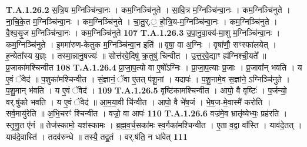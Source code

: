 \documentclass[17pt]{extarticle}
\begin{document}
                  \newline
                                                                  \textbf{ T.A.1.26.2} \newline
                  स॒त्रि॒य म॒ग्निञ्चि॑न्वा॒नः । कम॒ग्निञ्चि॑नुते ।  सा॒वि॒त्र म॒ग्निञ्चि॑न्वा॒नः । कम॒ग्निञ्चि॑नुते । ना॒चि॒के॒त म॒ग्निञ्चि॑न्वा॒नः । कम॒ग्निञ्चि॑नुते ।  चा॒तु॒र्.॒ हो॒त्रि॒य-म॒ग्निञ्चि॑न्वा॒नः । कम॒ग्निञ्चि॑नुते ।  वै॒श्व॒सृ॒ज म॒ग्निञ्चि॑न्वा॒नः । कम॒ग्निञ्चि॑नुते \textbf{ 107} \newline
                  \newline
                                                                  \textbf{ T.A.1.26.3} \newline
                  उ॒पा॒नु॒वा॒क्य॑-मा॒शु म॒ग्निञ्चि॑न्वा॒नः । कम॒ग्निञ्चि॑नुते । इ॒ममा॑रुण-केतुक म॒ग्निञ्चि॑न्वा॒न इति॑ ॥ वृषा॒ वा अ॒ग्निः । वृषा॑णौ॒ सꣳस्फा॑लयेत् । ह॒न्येता᳚स्य य॒ज्ञ्ः । तस्मा॒न्नानु॒षज्यः॑ ॥  सोत्त॑रवे॒दिषु॑ क्र॒तुषु॑ चिन्वीत । उ॒त्त॒र॒वे॒द्याꣳ ह्य॑ग्निश्ची॒यते᳚ ॥ प्र॒जाका॑मश्चिन्वीत \textbf{ 108} \newline
                  \newline
                                                                  \textbf{ T.A.1.26.4} \newline
                  प्रा॒जा॒प॒त्यो वा ए॒षो᳚ऽग्निः । प्रा॒जा॒प॒त्याः प्र॒जाः । प्र॒जावा᳚न् भवति । य ए॒वं ॅवेद॑ ॥ प॒शुका॑मश्चिन्वीत । सं॒ज्ञानं॒ ॅवा ए॒तत् प॑शू॒नां । यदापः॑ ।  प॒शू॒नामे॒व स॒ज्ञांने॒ ऽग्निञ्चि॑नुते । प॒शु॒मान् भ॑वति । य ए॒वं ॅवेद॑ । \textbf{ 109} \newline
                  \newline
                                                                  \textbf{ T.A.1.26.5} \newline
                  वृष्टि॑कामश्चिन्वीत । आपो॒ वै वृष्टिः॑ । प॒र्जन्यो॒ वर्.षु॑को भवति । य ए॒वं ॅवेद॑ ॥ आ॒म॒या॒वी चि॑न्वीत । आपो॒ वै भे॑ष॒जं । भे॒ष॒ज-मे॒वास्मै॑ करोति । सर्व॒मायु॑रेति ॥ अ॒भि॒चरꣳ॑ श्चिन्वीत । वज्रो॒ वा आपः॑ \textbf{ 110} \newline
                  \newline
                                                                  \textbf{ T.A.1.26.6} \newline
                  वज्र॑मे॒व भ्रातृ॑व्येभ्यः॒ प्रह॑रति । स्तृ॒णु॒त ए॑नं ॥ तेज॑स्कामो॒ यश॑स्कामः ।  ब्र॒ह्म॒व॒र्च॒सका॑मः स्व॒र्गका॑मश्चिन्वीत । ए॒ता व॒द्वा वा᳚स्ति । याव॑दे॒तत् । याव॑दे॒वास्ति॑ । तदव॑रुन्धे ॥ तस्यै॒ तद्व्र॒तं । वर्.ष॑ति॒ न धा॑वेत् \textbf{ 111} \newline
\end{document}
